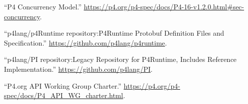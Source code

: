 \documentclass[11pt]{article}
\begin{document}
{{\begin{thebibliography}{39}
\mdbibitemlabel{{}[14]}\textquotedblleft{}P4 Concurrency Model.\textquotedblright{} \href{https://p4.org/p4-spec/docs/P4-16-v1.2.0.html\%23sec-concurrency}{{\ttfamily https://\hspace{0pt}p4.\hspace{0pt}org/\hspace{0pt}p4-\hspace{0pt}spec/\hspace{0pt}docs/\hspace{0pt}P4-\hspace{0pt}16-\hspace{0pt}v1.\hspace{0pt}2.\hspace{0pt}0.\hspace{0pt}html\#\hspace{0pt}sec-\hspace{0pt}concurrency}}.\label{p4concurrency}%

\mdbibitemlabel{{}[15]}\textquotedblleft{}p4lang/p4Runtime repository:P4Runtime Protobuf Definition Files and Specification.\textquotedblright{} \href{https://github.com/p4lang/p4runtime}{{\ttfamily https://\hspace{0pt}github.\hspace{0pt}com/\hspace{0pt}p4lang/\hspace{0pt}p4runtime}}.\label{p4runtimerepo}%

\mdbibitemlabel{{}[16]}\textquotedblleft{}p4lang/PI repository:Legacy Repository for P4Runtime, Includes Reference Implementation.\textquotedblright{} \href{https://github.com/p4lang/PI}{{\ttfamily https://\hspace{0pt}github.\hspace{0pt}com/\hspace{0pt}p4lang/\hspace{0pt}PI}}.\label{pirepo}%

\mdbibitemlabel{{}[17]}\textquotedblleft{}P4.org API Working Group Charter.\textquotedblright{} \href{https://p4.org/p4-spec/docs/P4_API_WG_charter.html}{{\ttfamily https://\hspace{0pt}p4.\hspace{0pt}org/\hspace{0pt}p4-\hspace{0pt}spec/\hspace{0pt}docs/\hspace{0pt}P4\_\hspace{0pt}API\_\hspace{0pt}WG\_\hspace{0pt}charter.\hspace{0pt}html}}.\label{p4apiwgcharter}%


\end{thebibliography}}}
\end{document}
